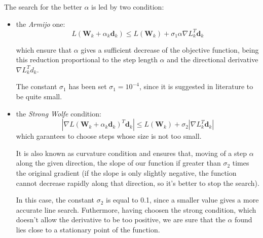 			The search for the better $\alpha$ is led by two condition:
			\begin{itemize}
			\item the \textit{Armijo} one:
			\begin{equation}
			\textit{L}(\textbf{W}_k+\alpha _k\textbf{d}_k)\leq \textit{L}(\textbf{W}_k)+\sigma_1\alpha\nabla \textit{L}_k^T\textbf{d}_k
			\end{equation}

			which ensure that $\alpha$ gives a sufficient decrease of the objective function, being this reduction proportional to the step length $\alpha$ and the directional derivative $\nabla \textit{L}_k^Td_k$.

			The constant $\sigma_1$ has been set $\sigma_1=10^{-4}$, since it is suggested in literature to be quite small.

			\item the \textit{Strong Wolfe} condition:
			\begin{equation}
			|\nabla \textit{L}(\textbf{W}_k+\alpha _k\textbf{d}_k)^T\textbf{d}_k|\leq \textit{L}(\textbf{W}_k)+\sigma_2|\nabla \textit{L}_k^T\textbf{d}_k|
			\end{equation}
			which garantees to choose steps whose size is not too small.

			It is also known as curvature condition and ensures that, moving of a step $\alpha$ along the given direction, the slope of our function if greater than $\sigma_2$ times the original gradient (if the slope is only slightly negative, the function cannot decrease rapidly along that direction, so it's better to stop the search).

			In this case, the constant $\sigma_2$ is equal to 0.1, since a smaller value gives a more accurate line search.
			Futhermore, having choosen the strong condition, which doesn't allow the derivative to be too positive, we are sure that the $\alpha$ found lies close to a stationary point of the function.
			\end{itemize}

